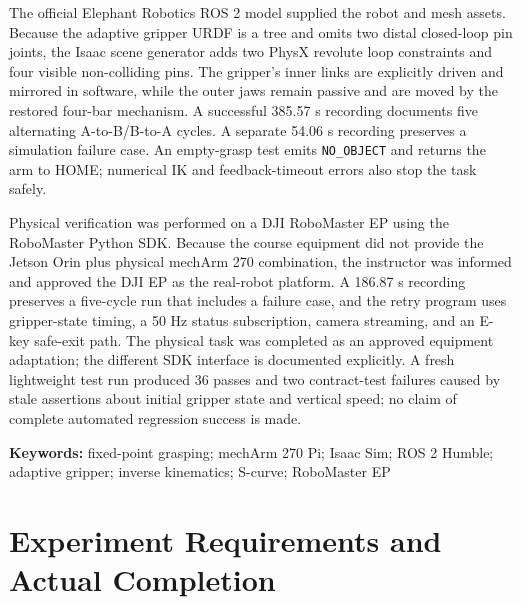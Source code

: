 \documentclass[UTF8,zihao=-4,scheme=chinese,fontset=none]{ctexart}
\begin{document}
The official Elephant Robotics ROS 2 model supplied the robot and mesh assets. Because the adaptive gripper URDF is a tree and omits two distal closed-loop pin joints, the Isaac scene generator adds two PhysX revolute loop constraints and four visible non-colliding pins. The gripper's inner links are explicitly driven and mirrored in software, while the outer jaws remain passive and are moved by the restored four-bar mechanism. A successful 385.57 s recording documents five alternating A-to-B/B-to-A cycles. A separate 54.06 s recording preserves a simulation failure case. An empty-grasp test emits \texttt{NO\_OBJECT} and returns the arm to HOME; numerical IK and feedback-timeout errors also stop the task safely.

Physical verification was performed on a DJI RoboMaster EP using the RoboMaster Python SDK. Because the course equipment did not provide the Jetson Orin plus physical mechArm 270 combination, the instructor was informed and approved the DJI EP as the real-robot platform. A 186.87 s recording preserves a five-cycle run that includes a failure case, and the retry program uses gripper-state timing, a 50 Hz status subscription, camera streaming, and an E-key safe-exit path. The physical task was completed as an approved equipment adaptation; the different SDK interface is documented explicitly. A fresh lightweight test run produced 36 passes and two contract-test failures caused by stale assertions about initial gripper state and vertical speed; no claim of complete automated regression success is made.

\noindent\textbf{Keywords:} fixed-point grasping; mechArm 270 Pi; Isaac Sim; ROS 2 Humble; adaptive gripper; inverse kinematics; S-curve; RoboMaster EP

\clearpage\begingroup{}\linespread{0.90}\selectfont\tableofcontents\endgroup\clearpage
{}\setcounter{page}{1}

\section{Experiment Requirements and Actual Completion}
\end{document}
